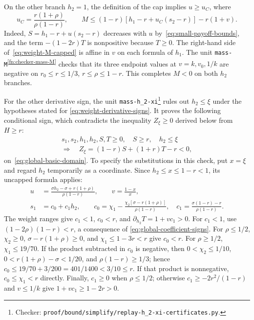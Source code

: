 \documentclass[11pt]{article}
\theoremstyle{remark}
\theoremstyle{plain}
\begin{document}
On the other branch $h_2=1$, the definition of the cap implies
$u\ge u_C$, where
\begin{equation}
 u_C=\frac{r(1+\rho)}{\rho(1-r)},\qquad
 M\le(1-r)[h_1-r+u_C(s_2-r)]-r(1+v).
 \label{eq:weight-M-capped}
\end{equation}
Indeed, $S=h_1-r+u(s_2-r)$ decreases with $u$
by~\eqref{eq:small-payoff-bounds}, and the term
$-(1-2r)T$ is nonpositive because $T\ge0$.
The right-hand side of~\eqref{eq:weight-M-capped} is affine in $v$
on each formula of $h_1$. The unit \nolinkurl{mass-M}\textsuperscript{\ref{fn:checker-mass-M}} checks that its
three endpoint values at $v=k,v_0,1/k$ are negative on
$r_0\le r\le1/3$, $r\le\rho\le1-r$. This completes $M<0$
on both $h_2$ branches.

For the other derivative sign, the unit \nolinkurl{mass-h_2-xi}\footnote{Checker:
\nolinkurl{proof/bound/simplify/replay-h_2-xi-certificates.py}.\label{fn:checker-mass-h_2-xi}}
rules out $h_2\le\xi$ under the hypotheses stated for
\eqref{eq:weight-derivative-signs}. It proves the following
conditional sign, which contradicts the inequality $Z_\xi\ge0$
derived below from $H\ge r$:
\begin{equation}
 \begin{gathered}
 s_1,s_2,h_1,h_2,S,T\ge0,\quad S\ge r,\quad h_2\le\xi\\
 \Longrightarrow\quad
 Z_\xi=(1-r)S+(1+r)T-r<0,
 \end{gathered}
 \label{eq:weight-h2-xi-exclusion}
\end{equation}
on~\eqref{eq:global-basic-domain}. To specify the substitutions
in this check, put $x=\xi$ and regard $h_2$ temporarily as a
coordinate. Since $h_2\le x\le1-r<1$, its uncapped formula applies:
\begin{equation}
 \begin{aligned}
 u&=\frac{\sigma h_2-\sigma+r(1+\rho)}{\rho(1-r)},\qquad
 v=\frac{1-x}{x},\\
 s_1&=c_0+c_1h_2,\qquad
 c_0=\chi_1-\frac{\chi_2[\sigma-r(1+\rho)]}{\rho(1-r)},\quad
 c_1=\frac{\sigma(1-r)-r}{\rho(1-r)}.
 \end{aligned}
 \label{eq:weight-h2-xi-substitution}
\end{equation}
The weight ranges give $c_1<1$, $c_0<r$, and
$\partial_{h_2}T=1+vc_1>0$. For $c_1<1$, use
$(1-2\rho)(1-r)<r$, a consequence of
\eqref{eq:global-coefficient-signs}. For $\rho\le1/2$,
$\chi_2\ge0$, $\sigma-r(1+\rho)\ge0$, and
$\chi_1\le1-3r<r$ give $c_0<r$. For $\rho\ge1/2$,
$\chi_1\le19/70$. If the product subtracted in $c_0$ is negative,
then $0<\chi_2\le1/10$,
$0<r(1+\rho)-\sigma<1/20$, and
$\rho(1-r)\ge1/3$; hence
$c_0\le19/70+3/200=401/1400<3/10\le r$.
If that product is nonnegative, $c_0\le\chi_1<r$ directly.
Finally, $c_1\ge0$ when $\rho\le1/2$; otherwise
$c_1\ge-2r^2/(1-r)$ and $v\le1/k$ give $1+vc_1\ge1-2r>0$.
\end{document}
